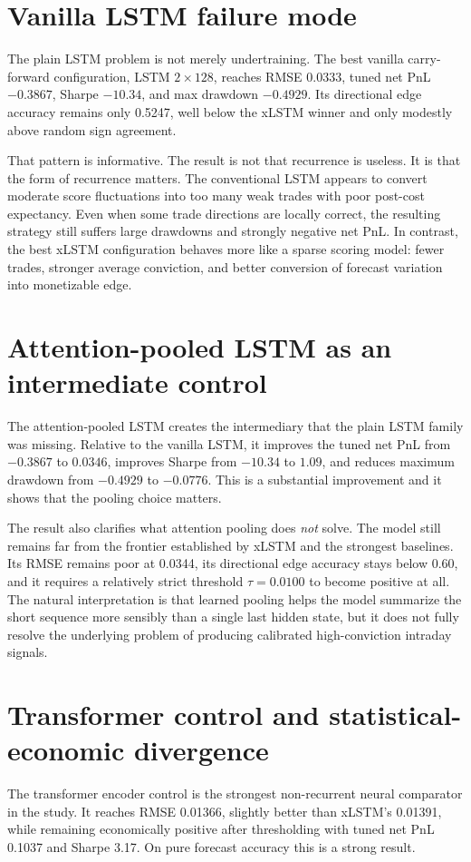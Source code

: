 \documentclass[12pt]{report}
\begin{document}
\section{Vanilla LSTM failure mode}
The plain LSTM problem is not merely undertraining. The best vanilla carry-forward configuration, LSTM \(2\times128\), reaches RMSE 0.0333, tuned net PnL \(-0.3867\), Sharpe \(-10.34\), and max drawdown \(-0.4929\). Its directional edge accuracy remains only 0.5247, well below the xLSTM winner and only modestly above random sign agreement.

That pattern is informative. The result is not that recurrence is useless. It is that the form of recurrence matters. The conventional LSTM appears to convert moderate score fluctuations into too many weak trades with poor post-cost expectancy. Even when some trade directions are locally correct, the resulting strategy still suffers large drawdowns and strongly negative net PnL. In contrast, the best xLSTM configuration behaves more like a sparse scoring model: fewer trades, stronger average conviction, and better conversion of forecast variation into monetizable edge.

\section{Attention-pooled LSTM as an intermediate control}
The attention-pooled LSTM creates the intermediary that the plain LSTM family was missing. Relative to the vanilla LSTM, it improves the tuned net PnL from \(-0.3867\) to \(0.0346\), improves Sharpe from \(-10.34\) to \(1.09\), and reduces maximum drawdown from \(-0.4929\) to \(-0.0776\). This is a substantial improvement and it shows that the pooling choice matters.

The result also clarifies what attention pooling does \emph{not} solve. The model still remains far from the frontier established by xLSTM and the strongest baselines. Its RMSE remains poor at 0.0344, its directional edge accuracy stays below 0.60, and it requires a relatively strict threshold \(\tau=0.0100\) to become positive at all. The natural interpretation is that learned pooling helps the model summarize the short sequence more sensibly than a single last hidden state, but it does not fully resolve the underlying problem of producing calibrated high-conviction intraday signals.

\section{Transformer control and statistical-economic divergence}
The transformer encoder control is the strongest non-recurrent neural comparator in the study. It reaches RMSE 0.01366, slightly better than xLSTM's 0.01391, while remaining economically positive after thresholding with tuned net PnL 0.1037 and Sharpe 3.17. On pure forecast accuracy this is a strong result.
\end{document}
